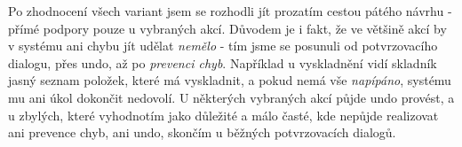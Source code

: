 Po zhodnocení všech variant jsem se rozhodli jít prozatím cestou pátého návrhu - přímé podpory pouze u vybraných akcí. Důvodem je i fakt, že ve většině akcí by v systému ani chybu jít udělat \emph{nemělo} - tím jsme se posunuli od potvrzovacího dialogu, přes undo, až po \emph{prevenci chyb}. Například u vyskladnění vidí skladník jasný seznam položek, které má vyskladnit, a pokud nemá vše \emph{napípáno}, systému mu ani úkol dokončit nedovolí. U některých vybraných akcí půjde undo provést, a u zbylých, které vyhodnotím jako důležité a málo časté, kde nepůjde realizovat ani prevence chyb, ani undo, skončím u běžných potvrzovacích dialogů.



